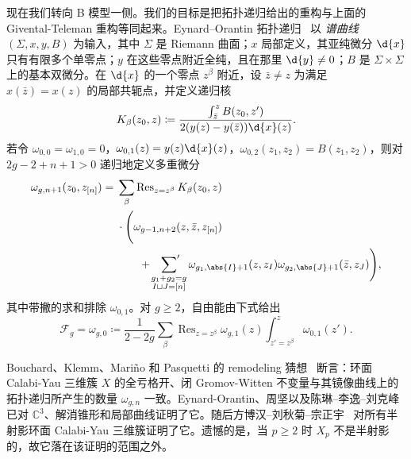 \documentclass{amsart}
\theoremstyle{definition}
\theoremstyle{remark}
\theoremstyle{plain}
\theoremstyle{definition}
\theoremstyle{remark}
\newcommand{\C}{\mathbb{C}}
\newcommand{\mc}[1]{\mathcal{#1}}
\newcommand{\on}[1]{\operatorname{#1}}
\newcommand{\1}{\mathbf{1}}
\newcommand{\2}{\mathbf{2}}
\newcommand{\3}{\mathbf{3}}
\begin{document}
现在我们转向 B 模型一侧。我们的目标是把拓扑递归给出的重构与上面的 Givental-Teleman 重构等同起来。Eynard--Orantin 拓扑递归~\cite{EO2007} 以 \textit{谱曲线} \((\Sigma,x,y,B)\) 为输入，其中 \(\Sigma\) 是 Riemann 曲面；\(x\) 局部定义，其亚纯微分 \(\d{x}\) 只有有限多个单零点；\(y\) 在这些零点附近全纯，且在那里 \(\d{y} \neq 0\)；\(B\) 是 \(\Sigma \times \Sigma\) 上的基本双微分。在 \(\d{x}\) 的一个零点 \(z^{\beta}\) 附近，设 \(\bar{z} \neq z\) 为满足 \(x(\bar{z}) = x(z)\) 的局部共轭点，并定义递归核
\[ K_{\beta}(z_0,z) \coloneqq \frac{\int_{\bar{z}}^z B(z_0,z')}{2(y(z)-y(\bar{z}))\d{x}(z)}. \]
若令 \(\omega_{0,0} = \omega_{1,0} = 0\)，\(\omega_{0,1}(z) = y(z)\d{x}(z)\)，\(\omega_{0,2}(z_1,z_2) = B(z_1,z_2)\)，则对 \(2g-2+n+1 > 0\) 递归地定义多重微分
\begin{align*}
    \omega_{g,n+1}(z_0,z_{[n]}) ={}& \sum_{\beta}\on{Res}_{z = z^{\beta}} K_{\beta}(z_0,z) \\
    &\cdot \Bigg( \omega_{g-1,n+2}(z,\bar{z},z_{[n]}) \\
    &\qquad + \sideset{}{'}\sum_{\substack{g_1+g_2 = g \\ I \sqcup J = [n]}}\omega_{g_1,\abs{I}+1}(z,z_I)\omega_{g_2,\abs{J}+1}(\bar{z},z_J)\Bigg),
\end{align*}
其中带撇的求和排除 \(\omega_{0,1}\)。对 \(g \geq 2\)，自由能由下式给出
\[ \mc{F}_g = \omega_{g,0} \coloneqq \frac{1}{2-2g}\sum_{\beta}\on{Res}_{z=z^{\beta}}\omega_{g,1}(z)\int_{z'=z^{\beta}}^z \omega_{0,1}(z'). \]

Bouchard、Klemm、Mari\~{n}o 和 Pasquetti 的 remodeling 猜想~\cite{BKMP2009} 断言：环面 Calabi-Yau 三维簇 \(X\) 的全亏格开、闭 Gromov-Witten 不变量与其镜像曲线上的拓扑递归所产生的数量 \(\omega_{g,n}\) 一致。Eynard-Orantin、周坚以及陈琳–李逸–刘克峰已对 \(\C^3\)、解消锥形和局部曲线证明了它。随后方博汉–刘秋菊–宗正宇~\cite{FLZ2020} 对所有半射影环面 Calabi-Yau 三维簇证明了它。遗憾的是，当 \(p \geq 2\) 时 \(X_p\) 不是半射影的，故它落在该证明的范围之外。
\end{document}
